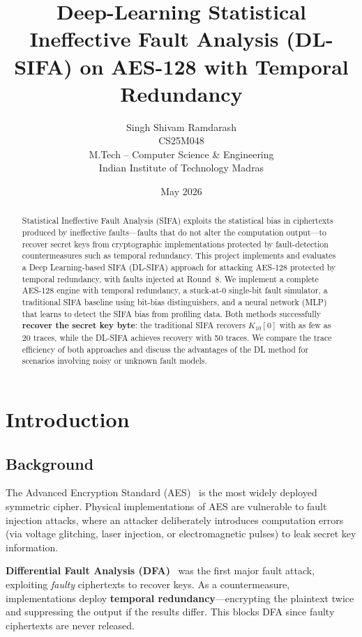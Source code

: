 \documentclass[11pt,a4paper]{article}
\title{\textbf{Deep-Learning Statistical Ineffective Fault Analysis (DL-SIFA) on AES-128 with Temporal Redundancy}}
\author{Singh Shivam Ramdarash \\ CS25M048 \\ M.Tech -- Computer Science \& Engineering \\ Indian Institute of Technology Madras}
\date{May 2026}
\begin{document}
\maketitle

\begin{abstract}
Statistical Ineffective Fault Analysis (SIFA) exploits the statistical bias in ciphertexts produced by ineffective faults---faults that do not alter the computation output---to recover secret keys from cryptographic implementations protected by fault-detection countermeasures such as temporal redundancy. This project implements and evaluates a Deep Learning-based SIFA (DL-SIFA) approach for attacking AES-128 protected by temporal redundancy, with faults injected at Round~8. We implement a complete AES-128 engine with temporal redundancy, a stuck-at-0 single-bit fault simulator, a traditional SIFA baseline using bit-bias distinguishers, and a neural network (MLP) that learns to detect the SIFA bias from profiling data. Both methods successfully \textbf{recover the secret key byte}: the traditional SIFA recovers $K_{10}[0]$ with as few as 20 traces, while the DL-SIFA achieves recovery with 50 traces. We compare the trace efficiency of both approaches and discuss the advantages of the DL method for scenarios involving noisy or unknown fault models.
\end{abstract}

\section{Introduction}

\subsection{Background}

The Advanced Encryption Standard (AES)~\cite{fips197} is the most widely deployed symmetric cipher. Physical implementations of AES are vulnerable to fault injection attacks, where an attacker deliberately introduces computation errors (via voltage glitching, laser injection, or electromagnetic pulses) to leak secret key information.

\textbf{Differential Fault Analysis (DFA)}~\cite{biham1997} was the first major fault attack, exploiting \emph{faulty} ciphertexts to recover keys. As a countermeasure, implementations deploy \textbf{temporal redundancy}---encrypting the plaintext twice and suppressing the output if the results differ. This blocks DFA since faulty ciphertexts are never released.
\end{document}

